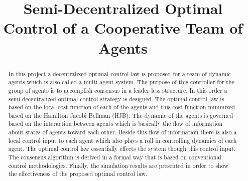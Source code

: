 \documentclass[conference]{IEEEtran}
\begin{document}
\title{Semi-Decentralized Optimal Control of a Cooperative Team of Agents}


\author{
}

\maketitle


\begin{abstract}
In this project a decentralized optimal control law is proposed for a team of dynamic agents which is also called a multi agent system. The purpose of this controller for the group of agents is to accomplish consensus in a leader less structure. In this order a semi-decentralized optimal control strategy is designed. The optimal control law is based on the local cost function of each of the agents and this cost function minimized based on the Hamilton Jacobi Bellman (HJB). The dynamic of the agents is governed based on the interaction between agents which is basically the flow of information about states of agents toward each other. Beside this flow of information there is also a local control input to each agent which also plays a roll in controlling dynamics of each agent. The optimal control law essentially effects the system though this control input. The consensus algorithm is derived in a formal way that is based on conventional control methodologies. Finally, the simulation results are presented in order to show the effectiveness of the proposed optimal control law.
\end{abstract}

\IEEEpeerreviewmaketitle
\end{document}
